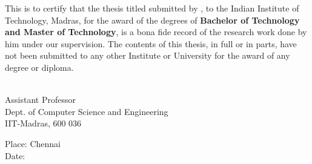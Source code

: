 \certificate

\vspace*{0.5in}

\noindent This is to certify that the thesis titled {\bf \mytitle}
submitted by {\bf \myauthor}, to the Indian Institute of Technology,
Madras, for the award of the degrees of {\bf Bachelor of Technology and
Master of Technology}, is a bona fide record of the research work done
by him under our supervision.  The contents of this thesis, in full or
in parts, have not been submitted to any other Institute or University
for the award of any degree or diploma.

\vspace*{1.5in}

\begin{singlespacing}
\hspace*{-0.25in}
\parbox{2.5in}{
 \\
\noindent Assistant Professor \\
\noindent Dept. of Computer Science and Engineering\\
\noindent IIT-Madras, 600 036 \\
} 
\hspace*{1.0in} 
\end{singlespacing}

\vspace*{0.25in}
\noindent Place: Chennai\\
\noindent Date: 


